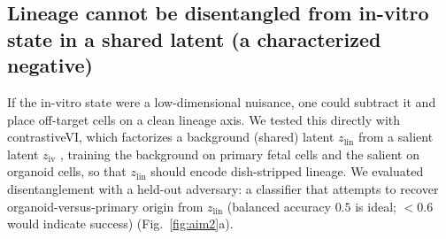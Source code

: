 \documentclass[11pt]{article}
\newcommand{\zlin}{\ensuremath{z_{\mathrm{lin}}}}
\newcommand{\ziv}{\ensuremath{z_{\mathrm{iv}}}}
\begin{document}
\subsection{Lineage cannot be disentangled from in-vitro state in a shared latent (a characterized negative)}
If the in-vitro state were a low-dimensional nuisance, one could subtract it and place off-target cells
on a clean lineage axis. We tested this directly with contrastiveVI, which factorizes a background
(shared) latent \zlin{} from a salient latent \ziv{} \citep{weinberger2023contrastivevi}, training the
background on primary fetal cells and the salient on organoid cells, so that \zlin{} should encode
dish-stripped lineage. We evaluated disentanglement with a held-out adversary: a classifier that
attempts to recover organoid-versus-primary origin from \zlin{} (balanced accuracy $0.5$ is ideal;
$<0.6$ would indicate success) (Fig.~\ref{fig:aim2}a).
\end{document}
